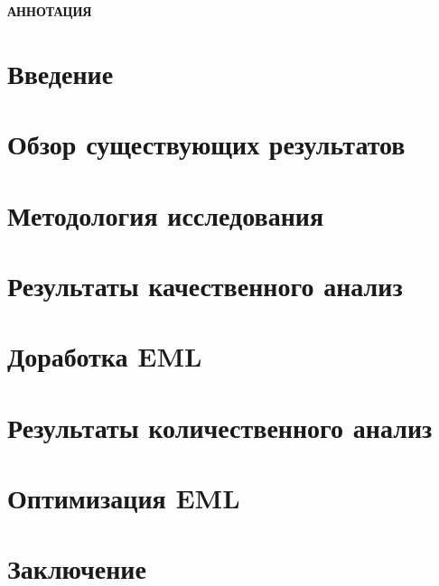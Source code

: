 





\newpage
\begin{center}
  \textbf{\large АННОТАЦИЯ}
  
\end{center}


\newpage
\tableofcontents

\setcounter{page}{2}

\section*{Введение}


\newpage
\section{Обзор существующих результатов}


\newpage
\section{Методология исследования}


\newpage
\section{Результаты качественного анализ}


\newpage
\section{Доработка EML}


\newpage
\section{Результаты количественного анализ}


\newpage
\section{Оптимизация EML}


\newpage
\section*{Заключение}


